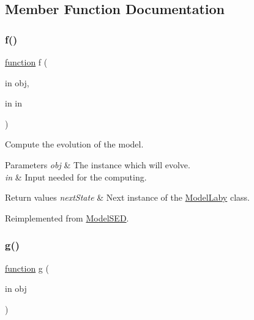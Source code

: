 \subsection{Member Function Documentation}
\mbox{\label{class_model_laby_a6f3b146c92a207e95690d08975e1e072}} 
\subsubsection{\texorpdfstring{f()}{f()}}
{\footnotesize\ttfamily \hyperlink{_plan__desuma_functions__2_players_8m_ac2ffb26d6f42d3bbcd7847b0873403f4}{function} f (\begin{DoxyParamCaption}\item[{in}]{obj,  }\item[{in}]{in }\end{DoxyParamCaption})\hspace{0.3cm}{\ttfamily [virtual]}}



Compute the evolution of the model. 


\begin{DoxyParams}{Parameters}
{\em obj} & The instance which will evolve. \\
\hline
{\em in} & Input needed for the computing. \\
\hline
\end{DoxyParams}

\begin{DoxyRetVals}{Return values}
{\em next\+State} & Next instance of the \hyperlink{class_model_laby}{Model\+Laby} class. \\
\hline
\end{DoxyRetVals}


Reimplemented from \hyperlink{class_model_s_e_d_ac36f9451c43b120828af4380858f2024}{Model\+S\+ED}.

\mbox{\label{class_model_laby_a07dadfabe92bf9a144b8a862720e7746}} 
\subsubsection{\texorpdfstring{g()}{g()}}
{\footnotesize\ttfamily \hyperlink{_plan__desuma_functions__2_players_8m_ac2ffb26d6f42d3bbcd7847b0873403f4}{function} g (\begin{DoxyParamCaption}\item[{in}]{obj }\end{DoxyParamCaption})\hspace{0.3cm}{\ttfamily [virtual]}}



